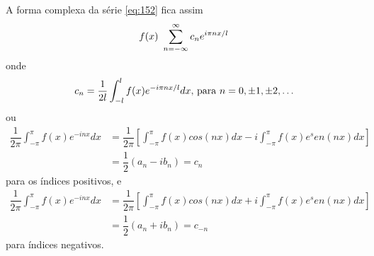 A forma complexa da série \ref{eq:152} fica assim
\begin{equation}
    \notag
    f(x) ~ \sum\limits_{n=-\infty}^{\infty}c_n e^{i\pi nx/l}
\end{equation}
onde 
\begin{equation}
\notag
    c_n = \dfrac{1}{2l}\int_{-l}^{l}f(x)e^{-i\pi nx/l}dx\text{, para }n = 0, \pm 1, \pm 2, \ldots
\end{equation} 
ou
\begin{equation}
    \begin{split}
        \dfrac{1}{2\pi}\int_{-\pi}^{\pi}f(x)e^{-inx}dx &= \dfrac{1}{2\pi}\left[\int_{-\pi}^{\pi}f(x)cos(nx)dx - i\int_{-\pi}^{\pi}f(x)e^sen(nx)dx\right]\\
        &= \dfrac{1}{2}(a_n - ib_n) = c_n
    \end{split}
\end{equation}
para os índices positivos, e 
\begin{equation}
    \begin{split}
        \dfrac{1}{2\pi}\int_{-\pi}^{\pi}f(x)e^{-inx}dx &= \dfrac{1}{2\pi}\left[\int_{-\pi}^{\pi}f(x)cos(nx)dx + i\int_{-\pi}^{\pi}f(x)e^sen(nx)dx\right]\\
        &= \dfrac{1}{2}(a_n + ib_n) = c_{-n}
    \end{split}
\end{equation}
para índices negativos.